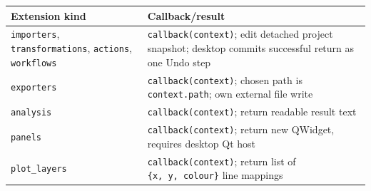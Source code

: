 \documentclass[
  10pt,
  a4paper,
  oneside]{scrreprt}
\begin{document}
\begin{longtable}[]{@{}ll@{}}
\toprule
\begin{minipage}[b]{0.47\columnwidth}\raggedright
Extension kind\strut
\end{minipage} & \begin{minipage}[b]{0.47\columnwidth}\raggedright
Callback/result\strut
\end{minipage}\tabularnewline
\midrule
\endhead
\begin{minipage}[t]{0.47\columnwidth}\raggedright
\texttt{importers}, \texttt{transformations}, \texttt{actions},
\texttt{workflows}\strut
\end{minipage} & \begin{minipage}[t]{0.47\columnwidth}\raggedright
\texttt{callback(context)}; edit detached project snapshot; desktop
commits successful return as one Undo step\strut
\end{minipage}\tabularnewline
\begin{minipage}[t]{0.47\columnwidth}\raggedright
\texttt{exporters}\strut
\end{minipage} & \begin{minipage}[t]{0.47\columnwidth}\raggedright
\texttt{callback(context)}; chosen path is \texttt{context.path}; own
external file write\strut
\end{minipage}\tabularnewline
\begin{minipage}[t]{0.47\columnwidth}\raggedright
\texttt{analysis}\strut
\end{minipage} & \begin{minipage}[t]{0.47\columnwidth}\raggedright
\texttt{callback(context)}; return readable result text\strut
\end{minipage}\tabularnewline
\begin{minipage}[t]{0.47\columnwidth}\raggedright
\texttt{panels}\strut
\end{minipage} & \begin{minipage}[t]{0.47\columnwidth}\raggedright
\texttt{callback(context)}; return new QWidget, requires desktop Qt
host\strut
\end{minipage}\tabularnewline
\begin{minipage}[t]{0.47\columnwidth}\raggedright
\texttt{plot\_layers}\strut
\end{minipage} & \begin{minipage}[t]{0.47\columnwidth}\raggedright
\texttt{callback(context)}; return list of \texttt{\{x,\ y,\ colour\}}
line mappings\strut
\end{minipage}\tabularnewline

\end{longtable}
\end{document}
